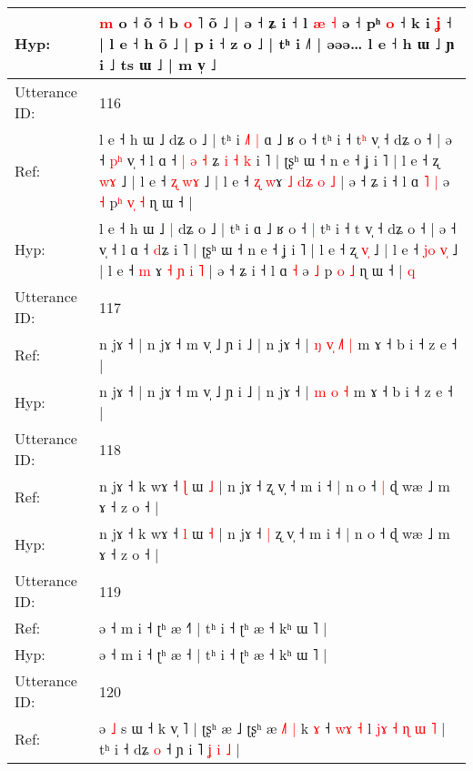 \documentclass[10pt]{article}
\DeclareRobustCommand{\hl}[1]{{\textcolor{red}{#1}}}
\begin{document}
\begin{longtable}{ll}
Hyp: & \hl{m} o ˧\hl{}\hl{} õ ˧ b \hl{}\hl{o} ˥ õ ˩ | ə ˧ ʑ i ˧ l\hl{}\hl{} \hl{æ} \hl{˧} ə ˧ pʰ \hl{}\hl{o} ˧ k i\hl{ }\hl{ʝ} ˧ | l e ˧ h õ ˩ | p i ˧ z o ˩ | tʰ i ˩˥ | əəə… l e ˧ h ɯ ˩ ɲ i ˩ ts ɯ ˩ | m v̩ ˩
 \\
\midrule
Utterance ID: & 116 \\
Ref: & l e ˧ h ɯ ˩\hl{}\hl{} dʑ o ˩ | tʰ i\hl{ }\hl{˩}\hl{˥}\hl{ }\hl{|} ɑ ˩ ʁ o ˧\hl{}\hl{} tʰ i ˧ t\hl{ʰ} v̩ ˧ dʑ o ˧ | ə ˧\hl{ }\hl{p}\hl{ʰ} v̩ ˧ l ɑ ˧\hl{ }\hl{|}\hl{ }\hl{ə} \hl{˧}\hl{ }ʑ\hl{ }\hl{i}\hl{ }\hl{˧}\hl{ }\hl{k} i ˥ | ʈʂʰ ɯ ˧ n e ˧ ʝ i ˥ | l e ˧ ʐ \hl{w}\hl{ɤ} ˩ | l e ˧ \hl{}\hl{ʐ} \hl{w}\hl{ɤ} ˩ | l e ˧ \hl{ʐ} \hl{w}ɤ \hl{˩} \hl{d}\hl{ʑ} \hl{o} \hl{˩} | ə ˧ ʑ i ˧ l ɑ\hl{ }\hl{˥} \hl{|} ə \hl{˧} p\hl{ʰ} \hl{v}\hl{̩} \hl{˧} ɳ ɯ ˧ |\hl{}\hl{}
 \\
Hyp: & l e ˧ h ɯ ˩\hl{ }\hl{|} dʑ o ˩ | tʰ i\hl{}\hl{}\hl{}\hl{}\hl{} ɑ ˩ ʁ o ˧\hl{ }\hl{|} tʰ i ˧ t\hl{} v̩ ˧ dʑ o ˧ | ə ˧\hl{}\hl{}\hl{} v̩ ˧ l ɑ ˧\hl{}\hl{}\hl{}\hl{} \hl{}\hl{d}ʑ\hl{}\hl{}\hl{}\hl{}\hl{}\hl{} i ˥ | ʈʂʰ ɯ ˧ n e ˧ ʝ i ˥ | l e ˧ ʐ \hl{v}\hl{̩} ˩ | l e ˧ \hl{j}\hl{o} \hl{v}\hl{̩} ˩ | l e ˧ \hl{m} \hl{}ɤ \hl{˧} \hl{}\hl{ɲ} \hl{i} \hl{˥} | ə ˧ ʑ i ˧ l ɑ\hl{}\hl{} \hl{˧} ə \hl{˩} p\hl{} \hl{}\hl{o} \hl{˩} ɳ ɯ ˧ |\hl{ }\hl{q}
 \\
\midrule
Utterance ID: & 117 \\
Ref: & n jɤ ˧ | n jɤ ˧ m v̩ ˩ ɲ i ˩ | n jɤ ˧ |\hl{ }\hl{ŋ} \hl{v}\hl{̩} \hl{˩}\hl{˥} \hl{|} m ɤ ˧ b i ˧ z e ˧ |
 \\
Hyp: & n jɤ ˧ | n jɤ ˧ m v̩ ˩ ɲ i ˩ | n jɤ ˧ |\hl{}\hl{} \hl{}\hl{m} \hl{}\hl{o} \hl{˧} m ɤ ˧ b i ˧ z e ˧ |
 \\
\midrule
Utterance ID: & 118 \\
Ref: & n jɤ ˧ k wɤ ˧ \hl{ɭ} ɯ \hl{˩} | n jɤ ˧\hl{}\hl{} ʐ v̩ ˧ m i ˧ | n o ˧\hl{ }\hl{|} ɖ wæ ˩ m ɤ ˧ z o ˧ |
 \\
Hyp: & n jɤ ˧ k wɤ ˧ \hl{l} ɯ \hl{˧} | n jɤ ˧\hl{ }\hl{|} ʐ v̩ ˧ m i ˧ | n o ˧\hl{}\hl{} ɖ wæ ˩ m ɤ ˧ z o ˧ |
 \\
\midrule
Utterance ID: & 119 \\
Ref: & ə ˧ m i ˧ ʈʰ æ ˧\hl{˥} | tʰ i ˧ ʈʰ æ ˧ kʰ ɯ ˥ |
 \\
Hyp: & ə ˧ m i ˧ ʈʰ æ ˧\hl{} | tʰ i ˧ ʈʰ æ ˧ kʰ ɯ ˥ |
 \\
\midrule
Utterance ID: & 120 \\
Ref: & ə \hl{˩} s ɯ ˧ k v̩ ˥ | ʈʂʰ æ ˩ ʈʂʰ æ\hl{ }\hl{˩}\hl{˥} \hl{|} k \hl{ɤ} ˧\hl{ }\hl{w}\hl{ɤ} \hl{˧} l \hl{j}\hl{ɤ} \hl{˧} \hl{ɳ} \hl{}\hl{ɯ} \hl{˥} | tʰ i ˧ dʑ \hl{o} ˧ ɲ i ˥\hl{ }\hl{ʝ}\hl{ }\hl{i}\hl{ }\hl{˩} |

\end{longtable}
\end{document}

